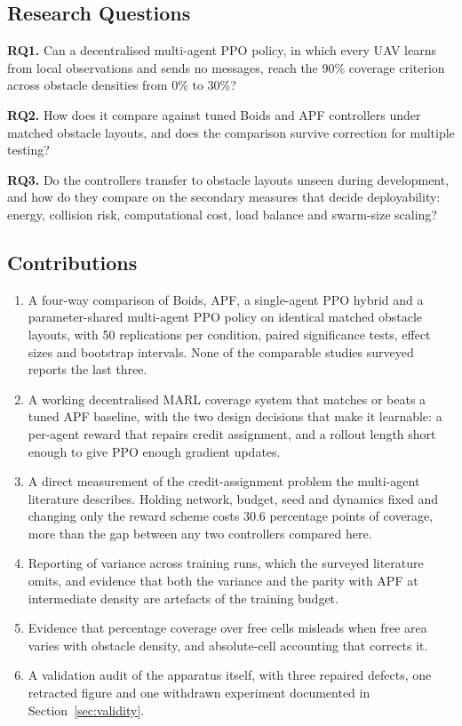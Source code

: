 \documentclass[a4paper, 10pt, conference]{ieeeconf}
\begin{document}
\subsection{Research Questions}

\textbf{RQ1.} Can a decentralised multi-agent PPO policy, in which
every UAV learns from local observations and sends no messages, reach
the 90\% coverage criterion across obstacle densities from 0\% to
30\%?

\textbf{RQ2.} How does it compare against tuned Boids and APF
controllers under matched obstacle layouts, and does the comparison
survive correction for multiple testing?

\textbf{RQ3.} Do the controllers transfer to obstacle layouts unseen
during development, and how do they compare on the secondary measures
that decide deployability: energy, collision risk, computational cost,
load balance and swarm-size scaling?

\subsection{Contributions}

\begin{enumerate}
    \item A four-way comparison of Boids, APF, a single-agent PPO
    hybrid and a parameter-shared multi-agent PPO policy on identical
    matched obstacle layouts, with 50 replications per condition,
    paired significance tests, effect sizes and bootstrap intervals.
    None of the comparable studies surveyed reports the last three.
    \item A working decentralised MARL coverage system that
    matches or beats a tuned APF baseline, with the two
    design decisions that make it learnable: a per-agent reward that
    repairs credit assignment, and a rollout length short enough to
    give PPO enough gradient updates.
    \item A direct measurement of the credit-assignment problem the
    multi-agent literature describes. Holding network, budget, seed
    and dynamics fixed and changing only the reward scheme costs 30.6
    percentage points of coverage, more than the gap
    between any two controllers compared here.
    \item Reporting of variance across training runs, which the
    surveyed literature omits, and evidence that both the variance and
    the parity with APF at intermediate density are artefacts of the
    training budget.
    \item Evidence that percentage coverage over free cells misleads
    when free area varies with obstacle density, and
    absolute-cell accounting that corrects it.
    \item A validation audit of the apparatus itself, with three
    repaired defects, one retracted figure and one withdrawn
    experiment documented in Section~\ref{sec:validity}.
\end{enumerate}
\end{document}
